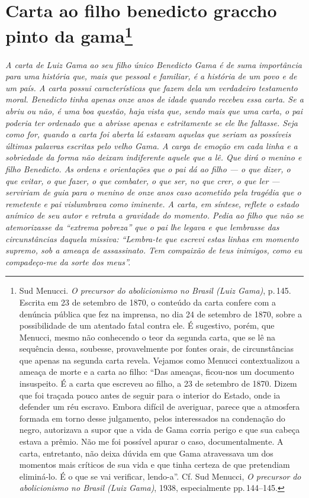 \chapter{Carta ao filho benedicto graccho pinto da gama\footnote{Sud Menucci. \emph{O precursor do abolicionismo no
  Brasil (Luiz Gama)}, p.\,145. Escrita em 23 de setembro de 1870, o conteúdo da
  carta confere com a denúncia pública que fez na imprensa, no dia
  24 de setembro de 1870, sobre a possibilidade de um atentado fatal contra ele. É
  sugestivo, porém, que Menucci, mesmo não conhecendo o teor da segunda
  carta, que se lê na sequência dessa, soubesse, provavelmente por
  fontes orais, de circunstâncias que apenas na segunda carta revela.
  Vejamos como Menucci contextualizou a ameaça de morte e a carta ao
  filho: ``Das ameaças, ficou-nos um documento insuspeito. É a carta que
  escreveu ao filho, a 23 de setembro de 1870. Dizem que foi traçada
  pouco antes de seguir para o interior do Estado, onde ia defender um
  réu escravo. Embora difícil de averiguar, parece que a atmosfera
  formada em torno desse julgamento, pelos interessados na condenação do
  negro, autorizava a supor que a vida de Gama corria perigo e que sua
  cabeça estava a prêmio. Não me foi possível apurar o caso,
  documentalmente. A carta, entretanto, não deixa dúvida em que Gama
  atravessava um dos momentos mais críticos de sua vida e que tinha
  certeza de que pretendiam eliminá-lo. É o que se vai verificar,
  lendo-a''. Cf. Sud Menucci, \emph{O precursor} \emph{do abolicionismo
  no Brasil (Luiz Gama)}, 1938, especialmente pp.\,144--145.}} %

\begin{didascalia}
\emph{A carta de Luiz Gama ao seu filho único Benedicto Gama é de suma
importância para uma história que, mais que pessoal e familiar, é a
história de um povo e de um país. A carta possui características que
fazem dela um verdadeiro testamento moral. Benedicto tinha apenas onze
anos de idade quando recebeu essa carta. Se a abriu ou não, é uma boa
questão, haja vista que, sendo mais que uma carta, o pai poderia ter
ordenado que a abrisse apenas e estritamente se ele lhe faltasse. Seja
como for, quando a carta foi aberta lá estavam aquelas que seriam as
possíveis últimas palavras escritas pelo velho Gama. A carga de emoção
em cada linha e a sobriedade da forma não deixam indiferente aquele que
a lê. Que dirá o menino e filho Benedicto. As ordens e orientações que o
pai dá ao filho --- o que dizer, o que evitar, o que fazer, o que
combater, o que ser, no que crer, o que ler --- serviriam de guia para o
menino de onze anos caso acometido pela tragédia que o remetente e pai
vislumbrava como iminente. A carta, em síntese, reflete o estado anímico
de seu autor e retrata a gravidade do momento. Pedia ao filho que não se
atemorizasse da ``extrema pobreza'' que o pai lhe legava e que lembrasse
das circunstâncias daquela missiva: ``Lembra-te que escrevi estas linhas
em momento supremo, sob a ameaça de assassinato. Tem compaixão de teus
inimigos, como eu compadeço-me da sorte dos meus''.}
\end{didascalia}


